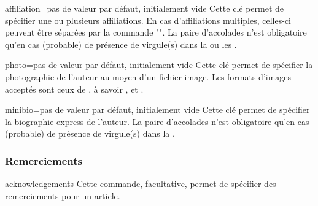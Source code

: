\begin{docKey}{affiliation}{={}}{pas de valeur par défaut,
    initialement vide}
  Cette clé permet de spécifier une ou plusieurs affiliations. En cas
  d'affiliations multiples, celles-ci peuvent être séparées par la commande
  "\newline". La paire d'accolades n'est obligatoire qu'en cas (probable) de
  présence de virgule(s) dans la ou les .
\end{docKey}

\begin{docKey}{photo}{={}}{pas de valeur par défaut,
    initialement vide}
  Cette clé permet de spécifier la photographie de l'auteur au moyen d'un
  fichier image. Les formats d'images acceptés sont ceux de ,
  à savoir ,  et .
\end{docKey}



\begin{docKey}{minibio}{={}}{pas de valeur par défaut,
    initialement vide}
  Cette clé permet de spécifier la biographie express de l'auteur. La paire
  d'accolades n'est obligatoire qu'en cas (probable) de présence de virgule(s)
  dans la .
\end{docKey}

\subsubsection{Remerciements}
\label{sec:remerciements}

\begin{docCommand}{acknowledgements}{}
  Cette commande, facultative, permet de spécifier des remerciements pour un article.
\end{docCommand}


